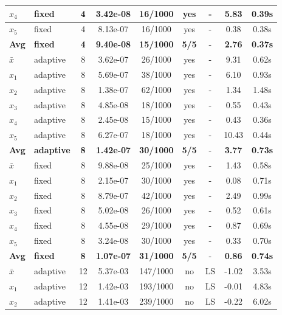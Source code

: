 \begin{longtable}{|l|l|c|c|c|c|c|c|c|}
\hline
$x_4$ & fixed & 4 & 3.42e-08 & 16/1000 & yes & - & 5.83 & 0.39s \\
\hline
$x_5$ & fixed & 4 & 8.13e-07 & 16/1000 & yes & - & 0.38 & 0.38s \\
\hline
\hline\hline
\textbf{Avg} & \textbf{fixed} & \textbf{4} & \textbf{9.40e-08} & \textbf{15/1000} & \textbf{5/5} & - & \textbf{2.76} & \textbf{0.37s} \\
\hline\hline
$\bar{x}$ & adaptive & 8 & 3.62e-07 & 26/1000 & yes & - & 9.31 & 0.62s \\
\hline
$x_1$ & adaptive & 8 & 5.69e-07 & 38/1000 & yes & - & 6.10 & 0.93s \\
\hline
$x_2$ & adaptive & 8 & 1.38e-07 & 62/1000 & yes & - & 1.34 & 1.48s \\
\hline
$x_3$ & adaptive & 8 & 4.85e-08 & 18/1000 & yes & - & 0.55 & 0.43s \\
\hline
$x_4$ & adaptive & 8 & 2.45e-08 & 15/1000 & yes & - & 0.43 & 0.36s \\
\hline
$x_5$ & adaptive & 8 & 6.27e-07 & 18/1000 & yes & - & 10.43 & 0.44s \\
\hline
\hline\hline
\textbf{Avg} & \textbf{adaptive} & \textbf{8} & \textbf{1.42e-07} & \textbf{30/1000} & \textbf{5/5} & - & \textbf{3.77} & \textbf{0.73s} \\
\hline\hline
\hline
$\bar{x}$ & fixed & 8 & 9.88e-08 & 25/1000 & yes & - & 1.43 & 0.58s \\
\hline
$x_1$ & fixed & 8 & 2.15e-07 & 30/1000 & yes & - & 0.08 & 0.71s \\
\hline
$x_2$ & fixed & 8 & 8.79e-07 & 42/1000 & yes & - & 2.49 & 0.99s \\
\hline
$x_3$ & fixed & 8 & 5.02e-08 & 26/1000 & yes & - & 0.52 & 0.61s \\
\hline
$x_4$ & fixed & 8 & 4.55e-08 & 29/1000 & yes & - & 0.87 & 0.69s \\
\hline
$x_5$ & fixed & 8 & 3.24e-08 & 30/1000 & yes & - & 0.33 & 0.70s \\
\hline
\hline\hline
\textbf{Avg} & \textbf{fixed} & \textbf{8} & \textbf{1.07e-07} & \textbf{31/1000} & \textbf{5/5} & - & \textbf{0.86} & \textbf{0.74s} \\
\hline\hline
$\bar{x}$ & adaptive & 12 & 5.37e-03 & 147/1000 & no & LS & -1.02 & 3.53s \\
\hline
$x_1$ & adaptive & 12 & 1.42e-03 & 193/1000 & no & LS & -0.01 & 4.83s \\
\hline
$x_2$ & adaptive & 12 & 1.41e-03 & 239/1000 & no & LS & -0.22 & 6.02s \\

\end{longtable}
